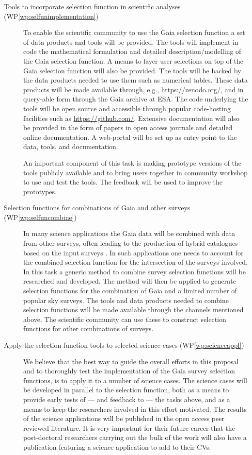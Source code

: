 \begin{description}
    \item[Tools to incorporate selection function in scientific analyses (WP\ref{wp:selfunimplementation})] To enable the scientific community to use the Gaia selection function a set of data products and tools will be provided. The tools will implement in code the mathematical formulation and detailed description/modelling of the Gaia selection function. A means to layer user selections on top of the Gaia selection function will also be provided. The tools will be backed by the data products needed to use them such as numerical tables. These data products will be made available through, e.g., \url{https://zenodo.org/}, and in query-able form through the Gaia archive at ESA. The code underlying the tools will be open source and accessible through popular code-hosting facilities such as \url{https://github.com/}. Extensive documentation will also be provided in the form of papers in open access journals and detailed online documentation. A web-portal will be set up as entry point to the data, tools, and documentation.
    
    An important component of this task is making prototype versions of the tools publicly available and to bring users together in community workshop to use and test the tools. The feedback will be used to improve the prototypes.
    \item[Selection functions for combinations of Gaia and other surveys (WP\ref{wp:selfuncombine})] In many science applications the Gaia data will be combined with data from other surveys, often leading to the production of hybrid catalogues based on the input surveys \citep[see for example][]{2019A&A...628A..94A}. In such applications one needs to account for the combined selection function for the intersection of the surveys involved. In this task a generic method to combine survey selection functions will be researched and developed. The method will then be applied to generate selection functions for the combination of Gaia and a limited number of popular sky surveys. The tools and data products needed to combine selection functions will be made available through the channels mentioned above. The scientific community can use these to construct selection functions for other combinations of surveys.
    \item[Apply the selection function tools to selected science cases (WP\ref{wp:scienceappl})] We believe that the best way to guide the overall efforts in this proposal and to thoroughly test the implementation of the Gaia survey selection functions, is to apply it to a number of science cases. The science cases will be developed in parallel to the selection function, both as a means to provide early tests of --- and feedback to --- the tasks above, and as a means to keep the researchers involved in this effort motivated. The results of the science applications will be published in the open access peer reviewed literature. It is very important for their future career that the post-doctoral researchers carrying out the bulk of the work will also have a publication featuring a science application to add to their CVs.
\end{description}

